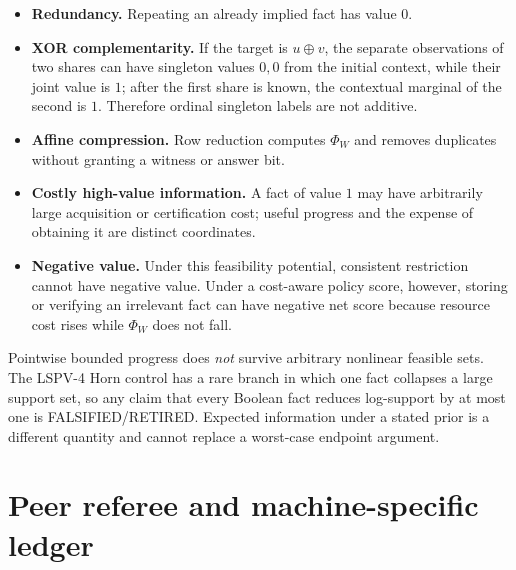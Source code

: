 \documentclass[11pt]{article}
\newcommand{\status}[1]{\textsc{#1}}
\begin{document}
\begin{itemize}[leftmargin=*]
\item \textbf{Redundancy.} Repeating an already implied fact has value $0$.
\item \textbf{XOR complementarity.} If the target is $u\oplus v$, the separate observations of two shares can have singleton values $0,0$ from the initial context, while their joint value is $1$; after the first share is known, the contextual marginal of the second is $1$.  Therefore ordinal singleton labels are not additive.
\item \textbf{Affine compression.} Row reduction computes $\Phi_W$ and removes duplicates without granting a witness or answer bit.
\item \textbf{Costly high-value information.} A fact of value $1$ may have arbitrarily large acquisition or certification cost; useful progress and the expense of obtaining it are distinct coordinates.
\item \textbf{Negative value.} Under this feasibility potential, consistent restriction cannot have negative value.  Under a cost-aware policy score, however, storing or verifying an irrelevant fact can have negative net score because resource cost rises while $\Phi_W$ does not fall.
\end{itemize}

Pointwise bounded progress does \emph{not} survive arbitrary nonlinear feasible sets.  The LSPV-4 Horn control has a rare branch in which one fact collapses a large support set, so any claim that every Boolean fact reduces log-support by at most one is \status{FALSIFIED/RETIRED}.  Expected information under a stated prior is a different quantity and cannot replace a worst-case endpoint argument.

\section{Peer referee and machine-specific ledger}
\end{document}
